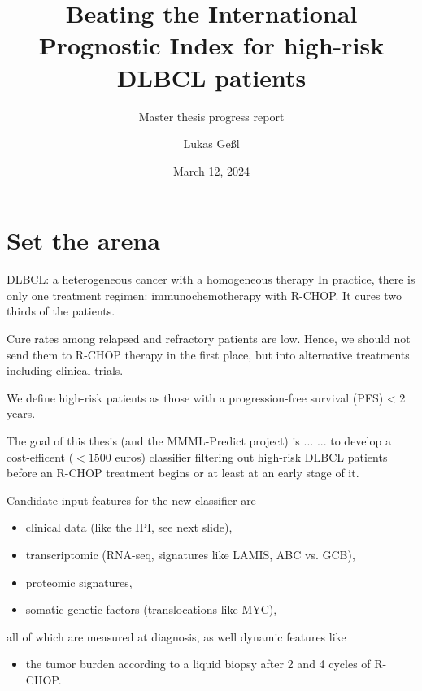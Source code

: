 \documentclass[10pt, aspectratio=169]{beamer}
\title{Beating the International Prognostic Index for high-risk DLBCL patients}
\subtitle{Master thesis progress report}
\date{March 12, 2024}
\author{Lukas Geßl}
\institute{Chair of Statistical Bioinformatics, Regensburg University}
\begin{document}
\maketitle

\section{Set the arena}

\begin{frame}{DLBCL: a heterogeneous cancer with a homogeneous therapy}
  In practice, there is only one treatment regimen: immunochemotherapy with R-CHOP. 
  It cures two thirds of the patients.

  Cure rates among relapsed and refractory patients are low. Hence, we should not send 
  them to R-CHOP therapy in the first place, but into alternative treatments including 
  clinical trials.
  
  We define \alert{high-risk} patients as those with a 
  \alert{progression-free survival (PFS) < 2 years}.

  \medskip
  \begin{block}{The goal of this thesis (and the MMML-Predict project) is ...}
    ... to develop a \alert{cost-efficent ($< \num{1500}$ euros) classifier filtering out 
    high-risk DLBCL patients} before an R-CHOP treatment begins or at least at an early 
    stage of it.
  \end{block}
\end{frame}

\begin{frame}{}
  Candidate input features for the new classifier are 
  \begin{itemize}
    \item clinical data (like the IPI, see next slide),
    \item transcriptomic (RNA-seq, signatures like LAMIS, ABC vs. GCB),
    \item proteomic signatures,
    \item somatic genetic factors (translocations like MYC),
  \end{itemize}
  all of which are measured \alert{at diagnosis}, as well \alert{dynamic} features like 
  \begin{itemize}
    \item the tumor burden according to a liquid biopsy after 2 and 4 cycles of R-CHOP. 
  \end{itemize}

\end{frame}
\end{document}
